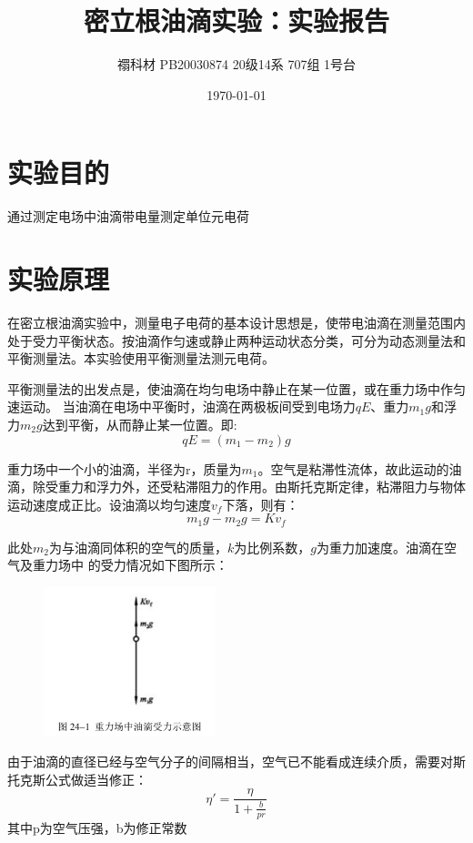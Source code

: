 \documentclass[UTF8]{ctexart}
\title{密立根油滴实验：实验报告}
\author{禤科材 PB20030874 20级14系 707组 1号台}
\date{\today}
\begin{document}
    \maketitle

    \section{实验目的}
    \begin{center}
        通过测定电场中油滴带电量测定单位元电荷
    \end{center}
    \section{实验原理}
    在密立根油滴实验中，测量电子电荷的基本设计思想是，使带电油滴在测量范围内处于受力平衡状态。按油滴作匀速或静止两种运动状态分类，可分为动态测量法和平衡测量法。本实验使用平衡测量法测元电荷。
    
    平衡测量法的出发点是，使油滴在均匀电场中静止在某一位置，或在重力场中作匀速运动。
    当油滴在电场中平衡时，油滴在两极板间受到电场力$qE$、重力$m_1g$和浮力$m_2g$达到平衡，从而静止某一位置。即:
    \begin{equation}
        qE=(m_1-m_2)g
    \end{equation}

    重力场中一个小的油滴，半径为r，质量为$m_1$。空气是粘滞性流体，故此运动的油滴，除受重力和浮力外，还受粘滞阻力的作用。由斯托克斯定律，粘滞阻力与物体运动速度成正比。设油滴以均匀速度$v_f$下落，则有：
    \begin{equation}
        m_1g-m_2g=Kv_f
    \end{equation}
    
    此处$m_2$为与油滴同体积的空气的质量，$k$为比例系数，$g$为重力加速度。油滴在空气及重力场中
    的受力情况如下图所示：
    \begin{figure}[ht]
        \centering 
        \includegraphics[width=5cm]{Screenshot 2021-05-18 at 21.37.35.png}
    \end{figure}

    由于油滴的直径已经与空气分子的间隔相当，空气已不能看成连续介质，需要对斯托克斯公式做适当修正：
    \begin{equation}
        \eta'=\frac{\eta}{1+\frac{b}{pr}}
    \end{equation}
    其中p为空气压强，b为修正常数
\end{document}
